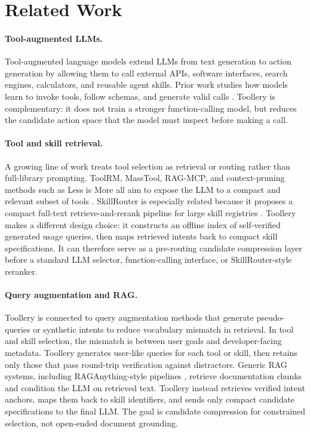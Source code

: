 \documentclass[11pt]{article}
\begin{document}
\section{Related Work}
\label{sec:related_work}

\paragraph{Tool-augmented LLMs.}
Tool-augmented language models extend LLMs from text generation to action generation by allowing them to call external APIs, software interfaces, search engines, calculators, and reusable agent skills. Prior work studies how models learn to invoke tools, follow schemas, and generate valid calls \citep{schick2023toolformer,yao2022react,patil2024gorilla,qin2023toolllm,li-etal-2023-api,liu2024toolace,liu2024apigen}. Toollery is complementary: it does not train a stronger function-calling model, but reduces the candidate action space that the model must inspect before making a call.

\paragraph{Tool and skill retrieval.}
A growing line of work treats tool selection as retrieval or routing rather than full-library prompting. ToolRM, MassTool, RAG-MCP, and context-pruning methods such as Less is More all aim to expose the LLM to a compact and relevant subset of tools \citep{agarwal2025toolrm,lin2025masstool,gan2025rag,paramanayakam2025less}. SkillRouter is especially related because it proposes a compact full-text retrieve-and-rerank pipeline for large skill registries \citep{zheng2026skillrouter}. Toollery makes a different design choice: it constructs an offline index of self-verified generated usage queries, then maps retrieved intents back to compact skill specifications. It can therefore serve as a pre-routing candidate compression layer before a standard LLM selector, function-calling interface, or SkillRouter-style reranker.

\paragraph{Query augmentation and RAG.}
Toollery is connected to query augmentation methods that generate pseudo-queries or synthetic intents to reduce vocabulary mismatch in retrieval. In tool and skill selection, the mismatch is between user goals and developer-facing metadata. Toollery generates user-like queries for each tool or skill, then retains only those that pass round-trip verification against distractors. Generic RAG systems, including RAGAnything-style pipelines \citep{guo2025raganything}, retrieve documentation chunks and condition the LLM on retrieved text. Toollery instead retrieves verified intent anchors, maps them back to skill identifiers, and sends only compact candidate specifications to the final LLM. The goal is candidate compression for constrained selection, not open-ended document grounding.
\end{document}
